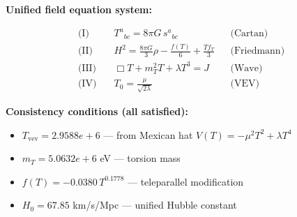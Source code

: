 
\textbf{Unified field equation system:}

\begin{align}
  \text{(I)} \quad & T^a{}_{bc} = 8\pi G \, s^a{}_{bc} && \text{(Cartan)} \\
  \text{(II)} \quad & H^2 = \frac{8\pi G}{3}\rho - \frac{f(T)}{6} + \frac{Tf_T}{3} && \text{(Friedmann)} \\
  \text{(III)} \quad & \Box T + m_T^2 T + \lambda T^3 = J && \text{(Wave)} \\
  \text{(IV)} \quad & T_0 = \frac{\mu}{\sqrt{2\lambda}} && \text{(VEV)}
\end{align}

\textbf{Consistency conditions (all satisfied):}
\begin{itemize}
  \item $T_{\text{vev}} = 2.9588e+6$ — from Mexican hat $V(T) = -\mu^2 T^2 + \lambda T^4$
  \item $m_T = 5.0632e+6$ eV — torsion mass
  \item $f(T) = -0.0380 \, T^{0.1778}$ — teleparallel modification
  \item $H_0 = 67.85$ km/s/Mpc — unified Hubble constant
\end{itemize}